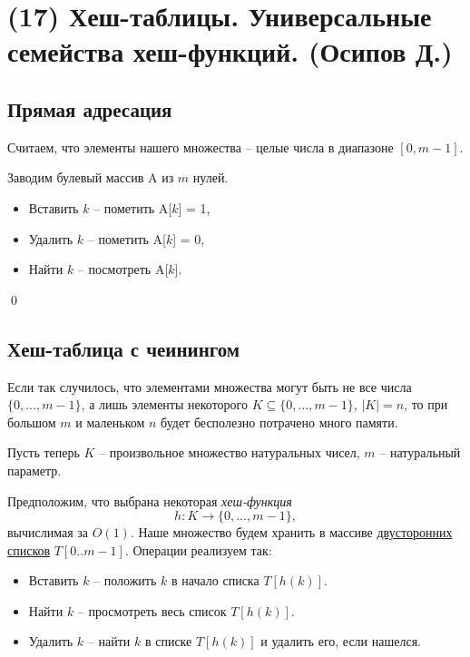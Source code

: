 \section{(17) Хеш-таблицы. Универсальные семейства хеш-функций. (Осипов Д.)}

\subsection{Прямая адресация}
Считаем, что элементы нашего множества -- целые числа в диапазоне $[0, m-1]$.

 Заводим булевый массив A из $m$ нулей. 
\begin{itemize}
    \item Вставить $k$ -- пометить A[$k$] = 1,
    \item Удалить $k$ -- пометить A[$k$] = 0,
    \item Найти $k$ -- посмотреть A[$k$].
\end{itemize}\qed

\subsection{Хеш-таблица с чеинингом}
Если так случилось, что элементами множества могут быть не все числа $\{0, \ldots, m-1\}$, а лишь элементы некоторого $K \subseteq \{0, \ldots, m-1\}$, $|K| = n$, то при большом $m$ и маленьком $n$ будет бесполезно потрачено много памяти.

Пусть теперь $K$ -- произвольное множество натуральных чисел, $m$ -- натуральный параметр.


Предположим, что выбрана некоторая \textit{хеш-функция} $$h: K \rightarrow \{0, \ldots, m-1\},$$ вычислимая за $O(1)$. Наше множество будем хранить в массиве \underline{двусторонних списков} $T[0..m-1]$. Операции реализуем так:
\begin{itemize}
    \item Вставить $k$ -- положить $k$ в начало списка $T[h(k)]$.
    \item Найти $k$ -- просмотреть весь список $T[h(k)]$.
    \item Удалить $k$ -- найти $k$ в списке $T[h(k)]$ и удалить его, если нашелся.
\end{itemize}

